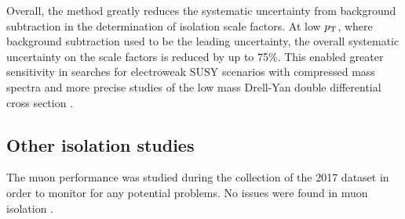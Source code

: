 Overall, the method greatly reduces the systematic uncertainty from
background subtraction in the determination of isolation scale factors.
At low $p_{\text{T}}$, where background subtraction used to be the leading
uncertainty, the overall systematic uncertainty on the scale factors
is reduced by up to 75\%. This enabled greater sensitivity in searches for
electroweak SUSY scenarios with compressed mass spectra
\cite{PhysRevD.97.052010} and more precise studies of the low mass
Drell-Yan double differential cross section \cite{Giuli:2681125}.

\subsection{Other isolation studies}

The muon performance was studied during the collection of the 2017 dataset
in order to monitor for any potential problems. No issues were 
found in muon isolation \cite{Bellomo:2282672}.

